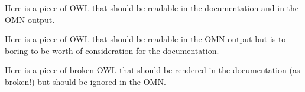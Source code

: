 \documentclass{article}
\begin{document}
Here is a piece of OWL that should be readable in the documentation and in the
OMN output. 



Here is a piece of OWL that should be readable in the OMN output but is to
boring to be worth of consideration for the documentation. 



Here is a piece of broken OWL that should be rendered in the documentation (as
broken!) but should be ignored in the OMN. 


\end{document}
